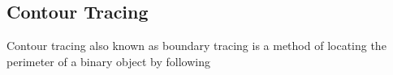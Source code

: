 \subsection{Contour Tracing}

Contour tracing also known as boundary tracing is a method of locating the perimeter of a binary object by following 